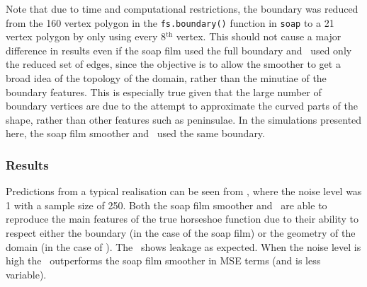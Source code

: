 Note that due to time and computational restrictions, the boundary was reduced from the 160 vertex polygon in the \texttt{fs.boundary()} function in \texttt{soap} to a 21 vertex polygon by only using every 8$^\text{th}$ vertex. This should not cause a major difference in results even if the soap film used the full boundary and \mdsap\ used only the reduced set of edges, since \label{cor-4s3}the objective is to allow the smoother to get a broad idea of the topology of the domain, rather than the minutiae of the boundary features. This is especially true given that the large number of boundary vertices are due to the attempt to approximate the curved parts of the shape, rather than other features such as peninsulae. In the simulations presented here, the soap film smoother and \mdsap\ used the same boundary.

\subsubsection{Results}

Predictions from a typical realisation can be seen from , where the noise level was 1 with a sample size of 250. Both the soap film smoother and \mdsap\ are able to reproduce the main features of the true horseshoe function due to their ability to respect either the boundary (in the case of the soap film) or the geometry of the domain (in the case of \mdsap). The \tprs\ shows leakage as expected. When the noise level is high the \mdsap\ outperforms the soap film smoother in MSE terms (and is less variable).


